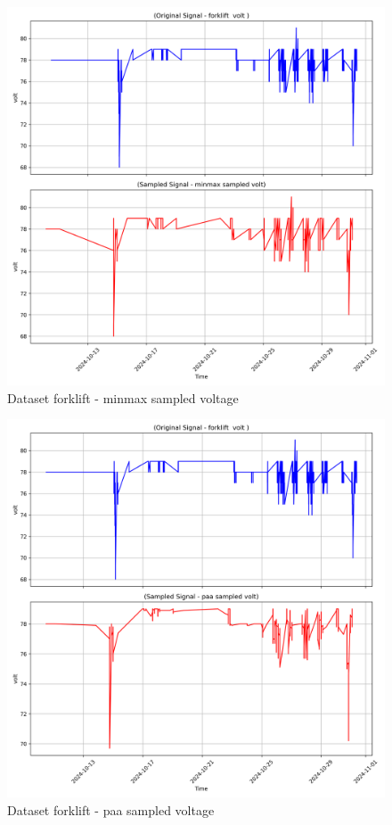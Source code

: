 \begin{figure}
    \centering
    \includegraphics[width=1\linewidth]{screenshots/forklift/minmax_sampled_volt_screenshot.png}
    \caption{Dataset forklift - minmax sampled voltage }
    \label{fig:forklift_minmax_sampled_volt_screenshot}
\end{figure}
\begin{figure}
    \centering
    \includegraphics[width=1\linewidth]{screenshots/forklift/paa_sampled_volt_screenshot.png}
    \caption{Dataset forklift - paa sampled voltage }
    \label{fig:forklift_paa_sampled_volt_screenshot}
\end{figure}
